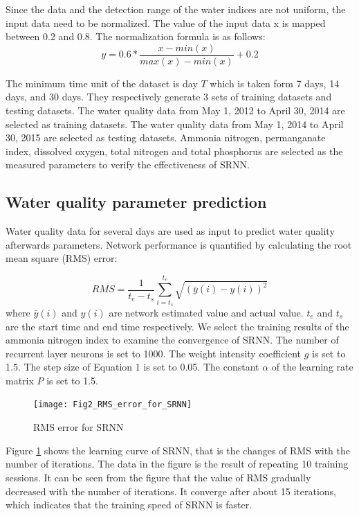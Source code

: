\documentclass[runningheads]{llncs}
\begin{document}
Since the data and the detection range of the water indices are not 
uniform, the input data need to be normalized. The value of the 
input data x is mapped between 0.2 and 0.8. The normalization formula is as follows:
\begin{equation}
y=0.6*\frac{x-min(x)}{max(x)-min(x)}+0.2  
\end{equation}

The minimum time unit of the dataset is day $T$ which is taken form 7 days, 14 days, 
and 30 days. They respectively generate 3 sets of training datasets and 
testing datasets. The water quality data from 
May 1, 2012 to April 30, 2014 are selected as training datasets. 
The water quality data  from May 1, 
2014 to April 30, 2015 are selected as testing datasets.
Ammonia nitrogen, permanganate index, dissolved oxygen, 
total nitrogen and total phosphorus are selected as the 
measured parameters to verify the effectiveness of SRNN.

\subsection{Water quality parameter prediction}
Water quality data for several days are used as input to 
predict water quality afterwards parameters. Network performance 
is quantified by calculating the root mean square (RMS) error:

\begin{equation}
RMS=  \frac{1}{t_e-t_s}\sum_{i=t_s}^{t_e}\sqrt{(\bar y(i)- y(i))^2}
\end{equation}
where $\bar y(i)$ and $y(i)$ are network estimated value and actual value. 
$t_e$ and $t_s$ are the start time and end time respectively. 
We select the training results of the ammonia nitrogen index to examine the convergence of SRNN.
The number of recurrent layer neurons is set to 1000.
The weight intensity coefficient $g$ is set to 1.5. 
The step size of Equation 1 is set to 0.05. 
The constant $\alpha$ of the learning rate matrix $P$ is set to 1.5.
\begin{figure}[htbp]
\centering
\texttt{[image: Fig2\_RMS\_error\_for\_SRNN]}
\caption{RMS error for SRNN}
\label{RMS error for SRNN}
\end{figure}

Figure \ref{RMS error for SRNN} shows the learning curve of SRNN, that is the changes of 
RMS with the number of iterations. The data in the figure is the 
result of repeating 10 training sessions. 
It can be seen from the figure that the value of RMS 
gradually decreased with the number of iterations. 
It converge after about 15 iterations, which indicates that the training 
speed of SRNN is faster.
\end{document}

